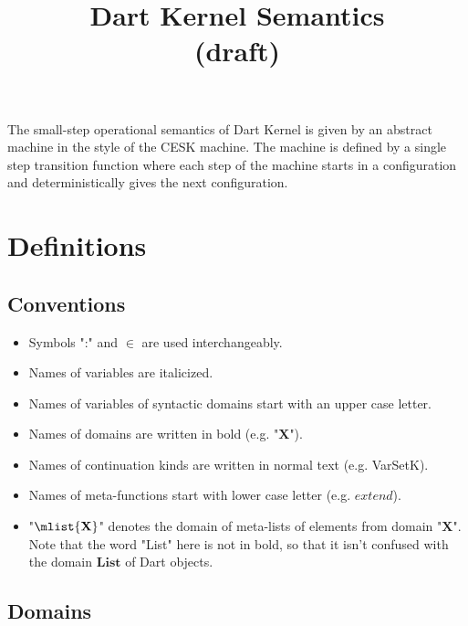 \documentclass{article}
\begin{document}
\title{Dart Kernel Semantics \\ (draft)}

\maketitle

The small-step operational semantics of Dart Kernel is given by an abstract machine in the style of the CESK machine. The machine is defined by a single step transition function where each step of the machine starts in a configuration and deterministically gives the next configuration.

\section{Definitions}
\label{sec:definitions}
\subsection{Conventions}
\label{subsec:conventions}
\begin{itemize}
\setlength{\itemsep}{0pt}
\item Symbols ":" and $\in$ are used interchangeably.
\item Names of variables are italicized.
\item Names of variables of syntactic domains start with an upper case letter.
\item Names of domains are written in bold (e.g. "$\mathbf{X}$").
\item Names of continuation kinds are written in normal text (e.g. VarSetK).
\item Names of meta-functions start with lower case letter (e.g. $\mathit{extend}$).
\item "$\mlist{\mathbf{X}}$" denotes the domain of meta-lists of elements from domain "$\mathbf{X}$". Note that the word "List" here is not in bold, so that it isn't confused with the domain $\mathbf{List}$ of Dart objects.
\end{itemize}
\subsection{Domains}
\label{subsec:domains}
\newcommand{\expr}{\ensuremath{\mathit{E}}}
\newcommand{\expri}[1]{\expr_\ensuremath{\mathit{#1}}}
\newcommand{\exprs}{\expr\ensuremath{\mathit{s}}}

\newcommand{\stmt}{\ensuremath{\mathit{S}}}
\newcommand{\stmti}[1]{\stmt_\ensuremath{#1}}
\newcommand{\stmts}{\stmt\ensuremath{\mathit{s}}}
\end{document}
